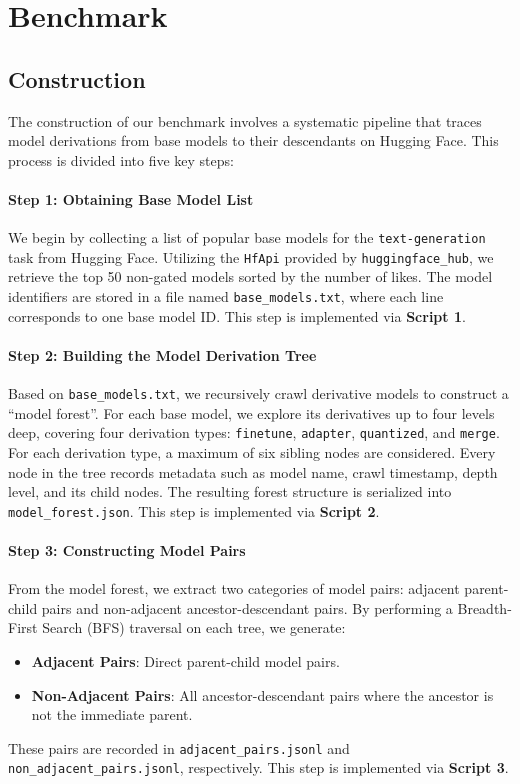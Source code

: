 \section{Benchmark}


\subsection{Construction}

The construction of our benchmark involves a systematic pipeline that traces model derivations from base models to their descendants on Hugging Face. This process is divided into five key steps:

\paragraph{Step 1: Obtaining Base Model List}
We begin by collecting a list of popular base models for the \texttt{text-generation} task from Hugging Face. Utilizing the \texttt{HfApi} provided by \texttt{huggingface\_hub}, we retrieve the top 50 non-gated models sorted by the number of likes. The model identifiers are stored in a file named \texttt{base\_models.txt}, where each line corresponds to one base model ID. This step is implemented via \textbf{Script 1}.

\paragraph{Step 2: Building the Model Derivation Tree}
Based on \texttt{base\_models.txt}, we recursively crawl derivative models to construct a “model forest”. For each base model, we explore its derivatives up to four levels deep, covering four derivation types: \texttt{finetune}, \texttt{adapter}, \texttt{quantized}, and \texttt{merge}. For each derivation type, a maximum of six sibling nodes are considered. Every node in the tree records metadata such as model name, crawl timestamp, depth level, and its child nodes. The resulting forest structure is serialized into \texttt{model\_forest.json}. This step is implemented via \textbf{Script 2}.

\paragraph{Step 3: Constructing Model Pairs}
From the model forest, we extract two categories of model pairs: adjacent parent-child pairs and non-adjacent ancestor-descendant pairs. By performing a Breadth-First Search (BFS) traversal on each tree, we generate:
\begin{itemize}
    \item \textbf{Adjacent Pairs}: Direct parent-child model pairs.
    \item \textbf{Non-Adjacent Pairs}: All ancestor-descendant pairs where the ancestor is not the immediate parent.
\end{itemize}
These pairs are recorded in \texttt{adjacent\_pairs.jsonl} and \texttt{non\_adjacent\_pairs.jsonl}, respectively. This step is implemented via \textbf{Script 3}.

